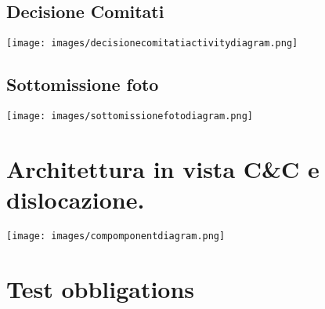 \documentclass{article}
\begin{document}
\subsection{Decisione Comitati}

\texttt{[image: images/decisionecomitatiactivitydiagram.png]}


\subsection{Sottomissione foto}

\texttt{[image: images/sottomissionefotodiagram.png]}


\section{Architettura in vista C\&C e dislocazione.}

\texttt{[image: images/compomponentdiagram.png]}

\section{Test obbligations}
\end{document}
